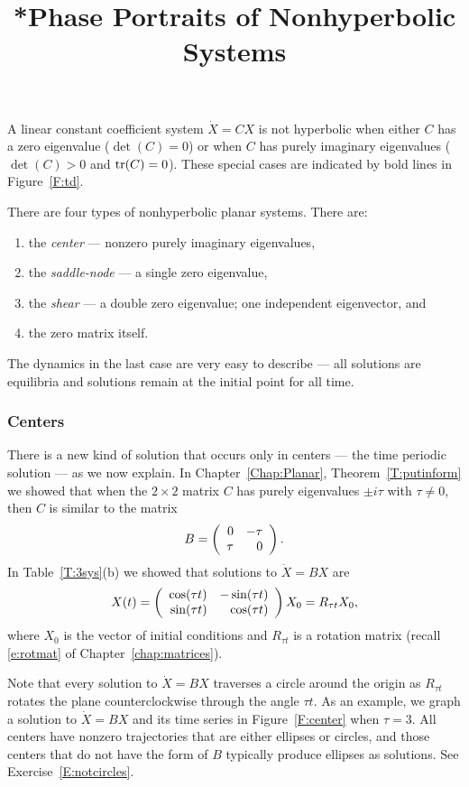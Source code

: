 \documentclass{ximera}
\title{*Phase Portraits of Nonhyperbolic Systems}
\begin{document}
\begin{abstract}
\end{abstract}
\maketitle

 \label{S:6.9}

A linear constant coefficient system $\dot{X}=CX$ is not hyperbolic
when either $C$ has a zero eigenvalue ($\det(C)=0$) or when $C$ has
purely imaginary eigenvalues ($\det(C)>0$ and ${\rm tr}(C)=0$).  These
special cases are indicated by bold lines in Figure~\ref{F:td}.

There are four types of nonhyperbolic planar systems.  There are:
\begin{enumerate}
\item	the {\em center} --- nonzero purely imaginary
eigenvalues,
\item	the {\em saddle-node\/} --- a single
zero eigenvalue,
\item	the {\em shear\/} --- a double zero eigenvalue;
one  independent eigenvector, and
\item	the zero matrix itself.
\end{enumerate}
The dynamics in the last case are very easy to describe --- all solutions
are equilibria and solutions remain at the initial point for all time.

\subsubsection*{Centers}

There is a new kind of solution that occurs only in centers --- the time
periodic solution --- as we now explain.
In Chapter~\ref{Chap:Planar},
Theorem~\ref{T:putinform} we showed that when the $2\times 2$
matrix $C$ has purely eigenvalues $\pm i\tau$ with $\tau\neq 0$, then $C$
is similar to the matrix
\[
B =   \left(\begin{array}{rr} 0 & -\tau\\ \tau &0\end{array}\right).
\]
In Table~\ref{T:3sys}(b) we showed that solutions to $\dot{X}=BX$ are
\[
X(t) = \left(\begin{array}{rr} \cos(\tau t) & -\sin(\tau t)\\ \sin(\tau t) &\cos(\tau t)\end{array}\right)X_0
=R_{\tau t}X_0,
\]
where $X_0$ is the vector of initial conditions and $R_{\tau t}$ is a
rotation matrix (recall \eqref{e:rotmat} of Chapter~\ref{chap:matrices}).

Note that every solution to $\dot{X}=BX$ traverses a circle around the
origin as $R_{\tau t}$ rotates the plane counterclockwise through the angle
$\tau t$.  As an example, we graph
a solution to $\dot{X}=BX$ and its time
series in Figure~\ref{F:center} when $\tau=3$.  All centers have nonzero
trajectories that are either ellipses or circles, and
those centers that do
not have the form of $B$ typically produce ellipses as solutions.  See
Exercise~\ref{E:notcircles}.
\end{document}
